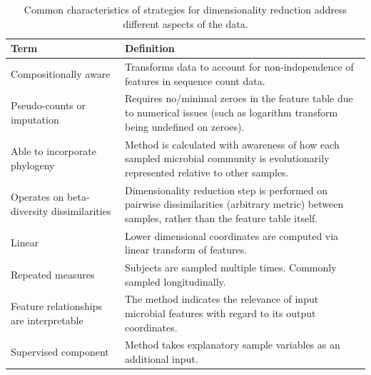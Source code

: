 \begin{table}[]
\caption{Common characteristics of strategies for dimensionality reduction address different aspects of the data.}
\label{review_table1}
\centering
\begin{tabular}{p{5cm}p{9cm}}
\hline
Term & Definition \\ \hline
Compositionally   aware & Transforms data to account for   non-independence of features in sequence count data. \\
Pseudo-counts   or imputation & Requires no/minimal zeroes in   the feature table due to numerical issues (such as logarithm transform being   undefined on zeroes). \\
Able to   incorporate phylogeny & Method is calculated with   awareness of how each sampled microbial community is evolutionarily   represented relative to other samples. \\
Operates   on beta-diversity dissimilarities & Dimensionality reduction step is   performed on pairwise dissimilarities (arbitrary metric) between samples,   rather than the feature table itself. \\
Linear & Lower dimensional coordinates   are computed via linear transform of features. \\
Repeated   measures & Subjects are sampled multiple   times. Commonly sampled longitudinally. \\
Feature   relationships are interpretable & The method indicates the   relevance of input microbial features with regard to its output coordinates. \\
Supervised   component & Method takes explanatory sample   variables as an additional input.
\end{tabular}
\end{table}

